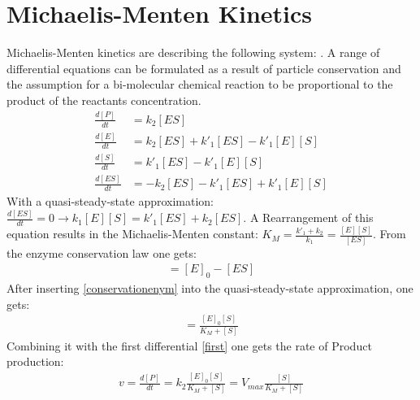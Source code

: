\documentclass[
  a4paper,BCOR10mm,oneside,
  bibtotoc,idxtotoc,
  headsepline,footsepline,%
  fleqn,openbib
]{scrbook}
\begin{document}
\section{Michaelis-Menten Kinetics}\label{Menten_der}
Michaelis-Menten kinetics are describing the following system:\newline
{}.
A range of differential equations can be formulated as a result of particle conservation and the assumption for a bi-molecular chemical reaction to be proportional to the product of the reactants concentration. 
\begin{align}
\frac{d[P]}{dt} &= k_{\mathrm{2}} [ES] \\ \label{first}
\frac{d[E]}{dt} &= k_{\mathrm{2}} [ES]+k'_{\mathrm{1}} [ES]-k'_{\mathrm{1}} [E][S]\\
\frac{d[S]}{dt} &= k'_{\mathrm{1}} [ES]-k'_{\mathrm{1}} [E][S]\\
\frac{d[ES]}{dt} &=  - k_{\mathrm{2}} [ES] -k'_{\mathrm{1}} [ES]+k'_{\mathrm{1}} [E][S]
\end{align}
With a quasi-steady-state approximation: $\frac{d[ES]}{dt}=0  \longrightarrow k_{\mathrm{1}}[E][S]=k'_{\mathrm{1}}[ES]+k_{\mathrm{2}}[ES]$. A Rearrangement of this equation results in the  Michaelis-Menten constant: $K_M=\frac{k'_{\mathrm{1}}+k_{\mathrm{2}}}{k_{\mathrm{1}}}=\frac{[E][S]}{[ES]}$. From the enzyme conservation law one gets:
\begin{align}
[E]=[E]_0 -[ES] \label{conservationenym}
\end{align}
After inserting \cref{conservationenym} into the quasi-steady-state approximation, one gets:
\begin{align}
 [ES]=\frac{[E]_0 [S]}{K_M+[S]}
\end{align}
Combining it with the first differential \cref{first} one gets the rate of Product production:
\begin{align}
 v= \frac{d[P]}{dt}= k_{\mathrm{2}} \frac{[E]_0 [S]}{K_M+[S]} = V_{max} \frac{[S]}{K_M+[S]}  
\end{align}



%

\nocite{}



\end{document}
